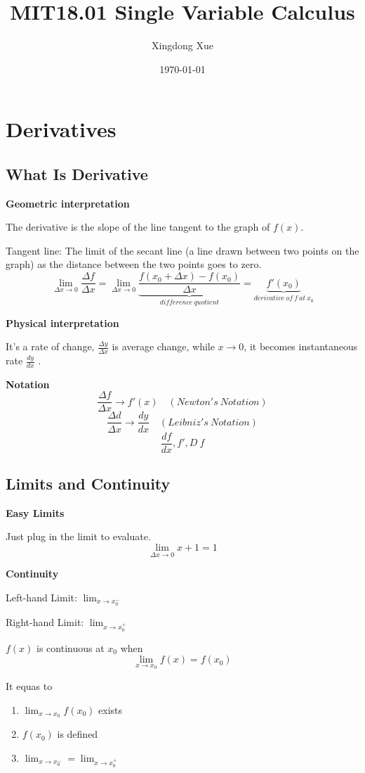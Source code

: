 \documentclass{article}
\title{MIT18.01 Single Variable Calculus}
\author{Xingdong Xue}
\date{\today}
\newcommand\limitx[1]{\lim_{x \to #1}}
\newcommand\limitdeltaxzero{\lim_{\Delta x \to 0}}
\begin{document}
\maketitle

\section{Derivatives}
\subsection{What Is Derivative}

\textbf{Geometric interpretation}

The derivative is the slope of the line tangent to the graph of $f(x)$.

Tangent line: The limit of the secant line (a line drawn between two points on the graph) as the distance between the two points goes to zero.
$$\limitdeltaxzero \frac{\Delta f}{\Delta x} = \limitdeltaxzero \underbrace{\frac{f(x_0+\Delta x)-f(x_0)}{\Delta x}}_{difference\ quotient} = \underbrace{f'(x_0)}_{derivative\ of\ f\ at\ x_0}$$

\textbf{Physical interpretation}

It's a rate of change, $\frac{\Delta y}{\Delta x}$ is average change, while $x \rightarrow 0$, it becomes instantaneous rate $\frac{dy}{dx}$ .

\textbf{Notation}
$$\frac{\Delta f}{\Delta x} \rightarrow f'(x) \quad (Newton's \  Notation)$$
$$\frac{\Delta d}{\Delta x} \rightarrow \frac{dy}{dx} \quad (Leibniz's \  Notation)$$
$$\frac{df}{dx}, f', D\ f$$

\subsection{Limits and Continuity}

\textbf{Easy Limits}

Just plug in the limit to evaluate.
$$\limitdeltaxzero x + 1 = 1$$

\textbf{Continuity}

Left-hand Limit: $\limitx{x_0^-}$

Right-hand Limit: $\limitx{x_0^+}$

$f(x)$ is continuous at $x_0$ when
$$\limitx{x_0} f(x) = f(x_0)$$

It equas to
\begin{enumerate}
\item $\limitx{x_0}f(x_0)$ exists
\item $f(x_0)$ is defined
\item $\limitx{x_0^-} = \limitx{x_0^+}$
\end{enumerate}
\end{document}
